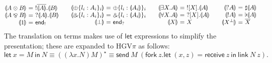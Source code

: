 \documentclass{easychair}
\makeatletter
\newcommand{\ba}{\begin{array}}
\newcommand{\ea}{\end{array}}
\newenvironment{eqs}{\ba{@{}r@{~}c@{~}l@{}}}{\ea}
\newcommand{\key}{\mathsf}
\newcommand{\set}[1]{\{ #1 \}}
\newcommand{\cptogv}[1]{\llparenthesis{#1}\rrparenthesis}
\newcommand{\row}[2]{\set{#1}_{#2}}
\newcommand{\gvOutput}[2]{\mathord{!}{#1}.{#2}}
\newcommand{\gvInput}[2]{\mathord{?}{#1}.{#2}}
\newcommand{\gvEndOutput}{\key{end}_!}
\newcommand{\gvEndInput}{\key{end}_?}
\newcommand{\gvPlus}[2]{\oplus \row{#1}{#2}}
\newcommand{\gvChoice}[2]{\binampersand \row{#1}{#2}}
\newcommand{\gvServer}[1]{\flat {#1}}
\newcommand{\gvService}[1]{\sharp {#1}}
\newcommand{\gvDual}[1]{\overline{#1}}
\newcommand{\gvOutputType}[2]{![{#1}].{#2}}
\newcommand{\gvInputType}[2]{?[{#1}].{#2}}
\newcommand{\la}{l}
\newcommand{\gvLink}[2]{\key{link}~{#1}~{#2}}
\newcommand{\gvPair}[2]{({#1},{#2})}
\newcommand{\gvLet}[3]{\key{let}~{#1}={#2}~\key{in}~{#3}}
\newcommand{\gvSend}[2]{\key{send}~{#1}~{#2}}
\newcommand{\gvReceive}[1]{\key{receive}~{#1}}
\newcommand{\gvFork}[2]{\key{fork}~{#1}.{#2}}
\newcommand{\gvReceiveK}[4]{\gvLet{\gvPair{#1}{#2}}{\gvReceive{#3}}{#4}}
\newcommand{\cpTimes}[2]{{#1} \otimes {#2}}
\newcommand{\cpPar}[2]{{#1} \mathbin{\bindnasrepma} {#2}}
\newcommand{\cpPlus}[2]{\oplus \row{#1}{#2}}
\newcommand{\cpWith}[2]{\binampersand \row{#1}{#2}}
\newcommand{\cpOne}{1}
\newcommand{\cpBottom}{\bot}
\newcommand{\cpOfCourse}[1]{\mathord{!}{#1}}
\newcommand{\cpWhyNot}[1]{\mathord{?}{#1}}
\newcommand{\cpDual}[1]{{#1}^\bot}
\newcommand{\cpExists}[2]{\exists {#1}.{#2}}
\newcommand{\cpForall}[2]{\forall {#1}.{#2}}
\newcommand{\hgvpi}{HGV$\pi$\xspace}
\newcommand{\lampi}[1]{({#1})^\star}
\makeatother
\begin{document}
\[
\ba{@{}c@{\qquad}c@{\qquad}c@{\qquad}c@{}}
\begin{eqs}
\cptogv{\cpTimes{A}{B}} &=& \gvOutput{\gvDual{\cptogv{A}}}{\cptogv{B}} \\
\cptogv{\cpPar{A}{B}}   &=& \gvInput{\cptogv{A}}{\cptogv{B}} \\
\cptogv{\cpOne}         &=& \gvEndOutput \\
\end{eqs}
&
\begin{eqs}
\cptogv{\cpPlus{\la_i:A_i}{i}} &=& \gvPlus{\la_i:\cptogv{A_i}}{i}  \\
\cptogv{\cpWith{\la_i:A_i}{i}} &=& \gvChoice{\la_i:\cptogv{A_i}}{i} \\
\cptogv{\cpBottom}      &=& \gvEndInput \\
\end{eqs}
&
\begin{eqs}
\cptogv{\cpExists{X}{A}} &=& \gvOutputType{X}{\cptogv{A}} \\
\cptogv{\cpForall{X}{A}} &=& \gvInputType{X}{\cptogv{A}} \\
\cptogv{X}               &=& X \\
\end{eqs}
&
\begin{eqs}
\cptogv{\cpWhyNot{A}}    &=& \gvService{\cptogv{A}} \\
\cptogv{\cpOfCourse{A}}  &=& \gvServer{\cptogv{A}} \\
\cptogv{\cpDual{X}}      &=& \gvDual{X} \\
\end{eqs}
\ea
\]
The translation on terms makes use of $\key{let}$ expressions to simplify the presentation; these
are expanded to \hgvpi as follows:
\[
\gvLet{x}{M}{N} \equiv \lampi{(\lambda x.N) M} \equiv \gvSend{M}{(\gvFork{z}{\gvReceiveK{x}{z}{z}{\gvLink{N}{z}}})}.
\]
\end{document}

